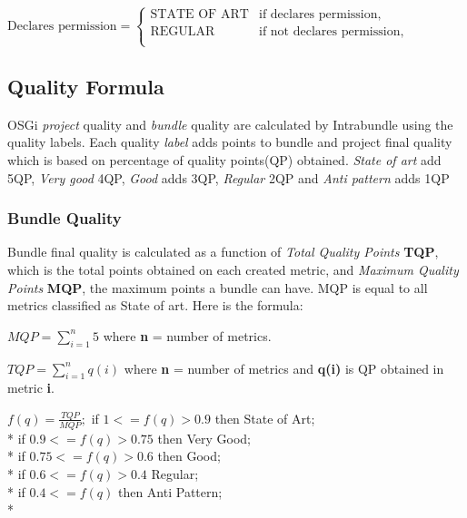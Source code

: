\(\text{Declares permission}=\begin{cases}
\text{STATE OF ART}& \text{if declares permission},\\
\text{REGULAR}& \text{if not declares permission}, \\
\end{cases} \)  \newline

\subsection{Quality Formula}

OSGi \emph{project} quality and \emph{bundle} quality are calculated by Intrabundle using the quality labels. Each quality \emph{label} adds points to bundle and project final quality which is based on percentage of quality points(QP) obtained. \emph{State of art} add 5QP, \emph{Very good} 4QP, \emph{Good} adds 3QP, \emph{Regular} 2QP and \emph{Anti pattern} adds 1QP

\subsubsection{Bundle Quality}
Bundle final quality is calculated as a function of \emph{Total Quality Points} \textbf{TQP}, which is the total points obtained on each created metric, and \emph{Maximum Quality Points} \textbf{MQP}, the maximum points a bundle can have. MQP is equal to all metrics classified as State of art. Here is the formula:\newline    

\(MQP = \sum_{i=1}^{n} 5 \) where \textbf{n} = number of metrics. \newline

\(TQP = \sum_{i=1}^{n} q(i) \) where \textbf{n} = number of metrics and \textbf{q(i)} is QP obtained in metric \textbf{i}. \newline

 
\(
f(q) = \frac{TQP}{MQP};
\)
\newline
\newline
 if \( 1 <= f(q) > 0.9 \) then State of Art; \\*
 if \( 0.9 <= f(q) > 0.75 \) then Very Good; \\*
 if \( 0.75 <= f(q) > 0.6 \) then Good; \\*
 if \( 0.6 <= f(q) > 0.4 \) Regular; \\*
 if \( 0.4 <= f(q) \) then Anti Pattern;\\*


